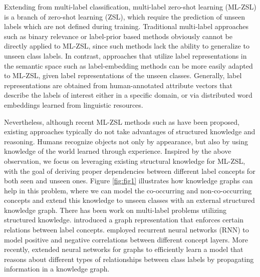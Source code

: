 \documentclass[10pt,twocolumn,letterpaper]{article}
\begin{document}
Extending from multi-label classification, multi-label zero-shot learning (ML-ZSL) is a branch of zero-shot learning (ZSL), which require the prediction of unseen labels which are not defined during training. Traditional multi-label approaches such as binary relevance or label-prior based methods obviously cannot be directly applied to ML-ZSL, since such methods lack the ability to generalize to unseen class labels. In contrast, approaches that utilize label representations in the semantic space such as label-embedding methods can be more easily adapted to ML-ZSL, given label representations of the unseen classes. Generally, label representations are obtained from human-annotated attribute vectors that describe the labels of interest either in a specific domain, or via distributed word embeddings learned from linguistic resources.

Nevertheless, although recent ML-ZSL methods such as \cite{Mensink_2014_CVPR,embedding2014ECCV,Zhang_2016_CVPR,Gaure_2017_UAI,Ren_etal_BMVC_17} have been proposed, existing approaches typically do not take advantages of structured knowledge and reasoning. Humans recognize objects not only by appearance, but also by using knowledge of the world learned through experience. Inspired by the above observation, we focus on leveraging existing structural knowledge for ML-ZSL, with the goal of deriving proper dependencies between different label concepts for both seen and unseen ones. Figure \ref{fig:fig1} illustrates how knowledge graphs can help in this problem, where we can model the co-occurring and non-co-occurring concepts and extend this knowledge to unseen classes with an external structured knowledge graph. There has been work on multi-label problems utilizing structured knowledge. 
\cite{deng2014large} introduced a graph representation that enforces certain relations between label concepts. 
\cite{hu2016learning} employed recurrent neural networks (RNN) \cite{hochreiter1997long,schuster1997bidirectional} to model positive and negative correlations between different concept layers. 
More recently, \cite{Marino_2017_CVPR} extended neural networks for graphs \cite{scarselli2009graph,DBLP:journals/corr/LiTBZ15} to efficiently learn a model that reasons about different types of relationships between class labels by propagating information in a knowledge graph. 
\end{document}
